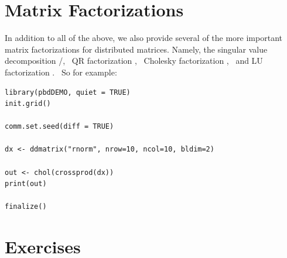 \section{Matrix Factorizations}

In addition to all of the above, we also provide several of the more important matrix factorizations for distributed matrices.  Namely, the singular value decomposition
/,~
QR factorization ,~
Cholesky factorization ,~
and LU factorization .~
So for example:

\begin{lstlisting}[language=rr,title=Matrix Factorizations]
library(pbdDEMO, quiet = TRUE)
init.grid()

comm.set.seed(diff = TRUE)

dx <- ddmatrix("rnorm", nrow=10, ncol=10, bldim=2)

out <- chol(crossprod(dx))
print(out)

finalize()
\end{lstlisting}




\section{Exercises}
\label{sec:basic_example_exercise}

